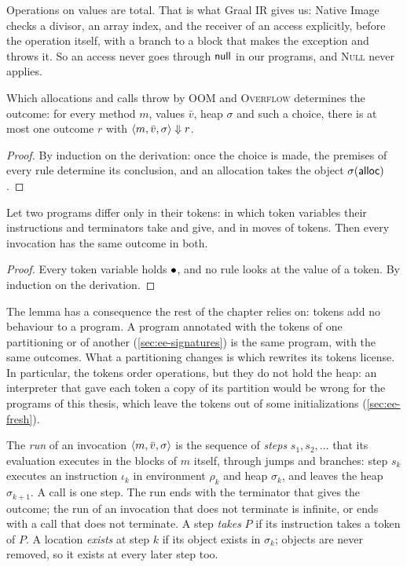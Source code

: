 Operations on values are total. That is what Graal IR gives us: Native Image
checks a divisor, an array index, and the receiver of an access explicitly,
before the operation itself, with a branch to a block that makes the exception
and throws it. So an access never goes through $\mathsf{null}$ in our programs, and
\textsc{Null} never applies.

\begin{lemma}[Determinism]\label{lem:ee-determinism}
Which allocations and calls throw by \textsc{OOM} and \textsc{Overflow}
determines the outcome: for every method $m$, values $\bar v$, heap $\sigma$ and
such a choice, there is at most one outcome $r$ with
$\langle m, \bar v, \sigma \rangle \Downarrow r$.
\end{lemma}

\begin{proof}
By induction on the derivation: once the choice is made, the premises of every
rule determine its conclusion, and an allocation takes the object
$\sigma(\mathsf{alloc})$.
\end{proof}

\begin{lemma}\label{lem:ee-erasure}
Let two programs differ only in their tokens: in which token variables their
instructions and terminators take and give, and in moves of tokens. Then every
invocation has the same outcome in both.
\end{lemma}

\begin{proof}
Every token variable holds $\bullet$, and no rule looks at the value of a token. By
induction on the derivation.
\end{proof}

The lemma has a consequence the rest of the chapter relies on: tokens add no
behaviour to a program. A program annotated with the tokens of one partitioning
or of another (\cref{sec:ee-signatures}) is the same program, with the same
outcomes. What a partitioning changes is which rewrites its tokens license. In
particular, the tokens order operations, but they do not hold the heap: an
interpreter that gave each token a copy of its partition would be wrong for the
programs of this thesis, which leave the tokens out of some initializations
(\cref{sec:ee-fresh}).

\begin{definition}[Runs]\label{def:ee-runs}
The \emph{run} of an invocation $\langle m, \bar v, \sigma \rangle$ is the sequence of
\emph{steps} $s_1, s_2, \ldots$ that its evaluation executes in the blocks of
$m$ itself, through jumps and branches: step $s_k$ executes an instruction
$\iota_k$ in environment $\rho_k$ and heap $\sigma_k$, and leaves the heap
$\sigma_{k+1}$. A call is one step. The run ends with the terminator that
gives the outcome; the run of an invocation that does not terminate is
infinite, or ends with a call that does not terminate. A step \emph{takes} $P$
if its instruction takes a token of $P$. A location \emph{exists} at step $k$
if its object exists in $\sigma_k$; objects are never removed, so it exists at
every later step too.
\end{definition}

